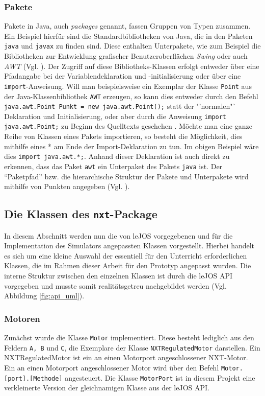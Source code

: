 \documentclass[paper=a4, pagesize, DIV=calc, BCOR=15mm, twoside=on, onecolumn=on, open = right, titlepage =on, parskip =half-, headsepline = on, footsepline = on, chapterprefix = on, appendixprefix = off, fontsize = 12pt, numbers = noenddot, abstract = on]{scrbook}
\numberwithin{equation}{chapter}
\theoremstyle{definition}
\theoremstyle{plain}
\theoremstyle{plain}
\theoremstyle{remark}
\theoremstyle{plain}
\theoremstyle{plain}
\begin{document}
\subsubsection*{Pakete}

Pakete in Java, auch \emph{packages} genannt, fassen Gruppen von Typen zusammen. Ein Beispiel hierfür sind die Standardbibliotheken von Java, die in den Paketen \texttt{java} und \texttt{javax} zu finden sind. Diese enthalten Unterpakete, wie zum Beispiel die Bibliotheken zur Entwicklung grafischer Benutzeroberflächen \emph{Swing} oder auch \emph{AWT} (Vgl. \cite[S. 265]{ullenboom:12}).
Der Zugriff auf diese Bibliotheks-Klassen erfolgt entweder über eine Pfadangabe bei der Variablendeklaration und -initialisierung oder über eine \texttt{import}-Anweisung. Will man beispielsweise ein Exemplar der Klasse \texttt{Point} aus der Java-Klassenbibliothek \texttt{AWT} erzeugen, so kann dies entweder durch den Befehl \texttt{java.awt.Point Punkt = new java.awt.Point();} statt der "'normalen"` Deklaration und Initialisierung, oder aber durch die Anweisung \texttt{import java.awt.Point;} zu Beginn des Quelltexts geschehen \cite[S. 266]{ullenboom:12}.
Möchte man eine ganze Reihe von Klassen eines Pakets importieren, so besteht die Möglichkeit, dies mithilfe eines * am Ende der Import-Deklaration zu tun. Im obigen Beispiel wäre dies \texttt{import java.awt.*;}. Anhand dieser Deklaration ist auch direkt zu erkennen, dass das Paket \texttt{awt} ein Unterpaket des Pakets \texttt{java} ist. Der "`Paketpfad"' bzw. die hierarchische Struktur der Pakete und Unterpakete wird mithilfe von Punkten angegeben (Vgl. \cite[S. 265ff.]{ullenboom:12}).
% 

\par \singlespacing
\subsection{Die Klassen des \texttt{nxt}-Package}
\label{sec:API}
\onehalfspacing
In diesem Abschnitt werden nun die von leJOS vorgegebenen und für die Implementation des Simulators angepassten Klassen vorgestellt. Hierbei handelt es sich um eine kleine Auswahl der essentiell für den Unterricht erforderlichen Klassen, die im Rahmen dieser Arbeit für den Prototyp angepasst wurden. Die interne Struktur zwischen den einzelnen Klassen ist durch die leJOS API vorgegeben und musste somit realitätsgetreu nachgebildet werden (Vgl. Abbildung \ref{fig:api_uml}).

\subsubsection{Motoren}
Zunächst wurde die Klasse \texttt{Motor} implementiert. Diese besteht lediglich aus den Feldern \texttt{A, B} und \texttt{C}, die Exemplare der Klasse \texttt{NXTRegulatedMotor} darstellen. Ein NXTRegulatedMotor ist ein an einen Motorport angeschlossener NXT-Motor. Ein an einen Motorport angeschlossener Motor wird über den Befehl \texttt{Motor.[port].[Methode]} angesteuert. Die Klasse \texttt{MotorPort} ist in diesem Projekt eine verkleinerte Version der gleichnamigen Klasse aus der leJOS API. 
\end{document}
